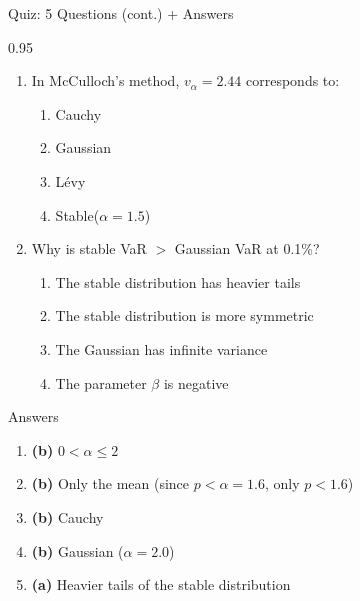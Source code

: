 \documentclass[9pt, aspectratio=169, t]{beamer}
\begin{document}
\begin{frame}{Quiz: 5 Questions (cont.) + Answers}
    \begin{cminipage}{0.95\textwidth}
\begin{enumerate}\setlength{\itemsep}{0pt}
    \setcounter{enumi}{3}
    \item In McCulloch's method, $v_\alpha = 2.44$ corresponds to:
    \begin{enumerate}\setlength{\itemsep}{0pt}
        \item[(a)] Cauchy
        \item[(b)] Gaussian
        \item[(c)] L\'{e}vy
        \item[(d)] Stable($\alpha = 1.5$)
    \end{enumerate}

    \vspace{0.2cm}
    \item Why is stable VaR $>$ Gaussian VaR at 0.1\%?
    \begin{enumerate}\setlength{\itemsep}{0pt}
        \item[(a)] The stable distribution has heavier tails
        \item[(b)] The stable distribution is more symmetric
        \item[(c)] The Gaussian has infinite variance
        \item[(d)] The parameter $\beta$ is negative
    \end{enumerate}
\end{enumerate}

\vspace{0.3cm}
\begin{exampleblock}{Answers}
\begin{enumerate}\setlength{\itemsep}{0pt}
    \item \textbf{(b)} $0 < \alpha \leq 2$
    \item \textbf{(b)} Only the mean (since $p < \alpha = 1.6$, only $p < 1.6$)
    \item \textbf{(b)} Cauchy
    \item \textbf{(b)} Gaussian ($\alpha = 2.0$)
    \item \textbf{(a)} Heavier tails of the stable distribution
\end{enumerate}
\end{exampleblock}
    \end{cminipage}
\end{frame}

\end{document}
